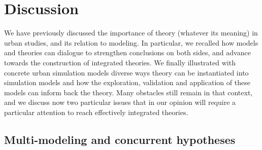 \documentclass[10pt,letterpaper]{article}
\begin{document}
\section{Discussion}


We have previously discussed the importance of theory (whatever its meaning) in urban studies, and its relation to modeling. In particular, we recalled how models and theories can dialogue to strengthen conclusions on both sides, and advance towards the construction of integrated theories. We finally illustrated with concrete urban simulation models diverse ways theory can be instantiated into simulation models and how the exploration, validation and application of these models can inform back the theory. Many obstacles still remain in that context, and we discuss now two particular issues that in our opinion will require a particular attention to reach effectively integrated theories.


\subsection{Multi-modeling and concurrent hypotheses}
\end{document}
